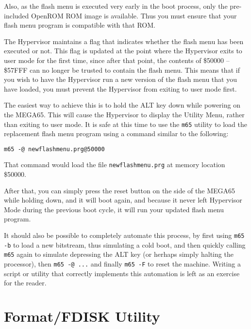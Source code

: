 Also, as the flash menu is executed very early in the boot process, only the pre-included OpenROM ROM image is available.  Thus you must ensure that your flash menu program is compatible with that ROM.

The Hypervisor maintains a flag that indicates whether the flash menu has been executed or not. This flag is updated at the point
where the Hypervisor exits to user mode for the first time, since after that point, the contents of \$50000 -- \$57FFF can no longer
be trusted to contain the flash menu.  This means that if you wish to have the Hypervisor run a new version of the flash menu that
you have loaded, you must prevent the Hypervisor from exiting to user mode first.

The easiest way to achieve this is to hold the ALT key down while powering on the MEGA65.  This will cause the Hypervisor to display the Utility Menu, rather than exiting to user mode.  It is safe at this time to use the {\tt m65} utility to load the replacement flash menu program using a command similar to the following:

\begin{tcolorbox}[colback=black,coltext=white]
\verbatimfont{\codefont}
\begin{verbatim}
m65 -@ newflashmenu.prg@50000
\end{verbatim}
\end{tcolorbox}

That command would load the file {\tt newflashmenu.prg} at memory location \$50000.

After that, you can simply press the reset button on the side of the MEGA65 while holding  down,
and it will boot again, and because it never left Hypervisor Mode during the previous boot cycle, it will run your
updated flash menu program.

It should also be possible to completely automate this process, by first using {\tt m65 -b} to load a new bitstream, thus simulating a cold boot, and then quickly calling {\tt m65} again to simulate depressing the ALT key (or herhaps simply halting the processor), then {\tt m65 -@ ...} and finally {\tt m65 -F} to reset the machine.  Writing a script or utility that correctly implements this automation is left as an exercise for the reader.

\section{Format/FDISK Utility}

